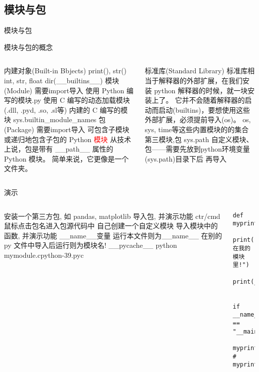 \subsection{模块与包}
\begin{frame}[standout] 模块与包 \end{frame}
\begin{frame}{模块与包的概念}
    \begin{columns}
        \begin{myoutline}
            \1 内建对象(Built-in Bbjects)
                \2 print(), str()
                \2 int, str, float
                \2 dir(\_\_builtins\_\_) 
            \1 模块(Module)
                \2 需要import导入
                \2 使用 Python 编写的模块.py
                \2 使用 C 编写的动态加载模块(.dll, .pyd, .so, .sl等)
                \2 内建的 C 编写的模块 sys.builtin\_module\_names
            \1 包(Package)
                \2 需要import导入
                \2 可包含子模块或递归地包含子包的 Python \textcolor{red}{模块}
                \2 从技术上说，包是带有 \_\_path\_\_ 属性的 Python 模块。
                \2 简单来说，它更像是一个文件夹。
        \end{myoutline}
        \begin{myoutline}
            \1 标准库(Standard Library)
                \2 标准库相当于解释器的外部扩展，在我们安装 python 解释器的时候，就一块安装上了。
                \2 它并不会随着解释器的启动而启动(builtins)，要想使用这些外部扩展，必须提前导入(os)。
                \2 os, sys, time等这些内置模块的的集合
            \1 第三模块,包
            \1 sys.path
                \2 自定义模块、包——需要先放到python环境变量(sys.path)目录下后 再导入
        \end{myoutline}
    \end{columns}
\end{frame}

\begin{frame}[fragile]{演示}
    \begin{columns}
        \begin{myoutline}
            \1 安装一个第三方包, 如 pandas, matplotlib
                \2 导入包, 并演示功能
                \2 ctr/cmd 鼠标点击包名进入包源代码中
            \1 自己创建一个自定义模块
                \2 导入模块中的函数, 并演示功能
                \2 \_\_name\_\_变量
                    \3 运行本文件则为\_\_name\_\_
                    \3 在别的 py 文件中导入后运行则为模块名!
                \2 \_\_pycache\_\_
                    \3  python mymodule.cpython-39.pyc
        \end{myoutline}
        \begin{lstlisting}
def myprint():
    print("我在我的模块里!")
    print(__name__)


if __name__ == "__main__":
    myprint()
# myprint()
        \end{lstlisting}
    \end{columns}
\end{frame}


